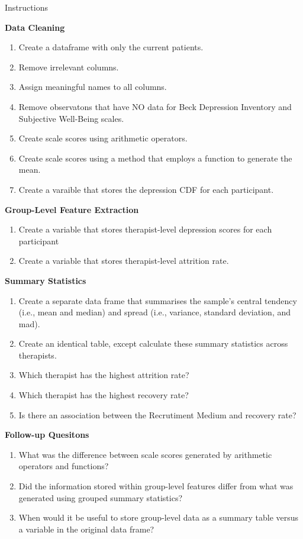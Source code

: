 \documentclass[]{book}
\theoremstyle{definition}
\theoremstyle{definition}
\theoremstyle{definition}
\theoremstyle{remark}
\begin{document}
Instructions

\textbf{Data Cleaning}

\begin{enumerate}
\def\labelenumi{\arabic{enumi}.}
\item
  Create a dataframe with only the current patients.
\item
  Remove irrelevant columns.
\item
  Assign meaningful names to all columns.
\item
  Remove observatons that have NO data for Beck Depression Inventory and Subjective Well-Being scales.
\item
  Create scale scores using arithmetic operators.
\item
  Create scale scores using a method that employs a function to generate the mean.
\item
  Create a varaible that stores the depression CDF for each participant.
\end{enumerate}

\textbf{Group-Level Feature Extraction}

\begin{enumerate}
\def\labelenumi{\arabic{enumi}.}
\item
  Create a variable that stores therapist-level depression scores for each participant
\item
  Create a variable that stores therapist-level attrition rate.
\end{enumerate}

\textbf{Summary Statistics}

\begin{enumerate}
\def\labelenumi{\arabic{enumi}.}
\item
  Create a separate data frame that summarises the sample's central tendency (i.e., mean and median) and spread (i.e., variance, standard deviation, and mad).
\item
  Create an identical table, except calculate these summary statistics across therapists.
\item
  Which therapist has the highest attrition rate?
\item
  Which therapist has the highest recovery rate?
\item
  Is there an association between the Recrutiment Medium and recovery rate?
\end{enumerate}

\textbf{Follow-up Quesitons}

\begin{enumerate}
\def\labelenumi{\arabic{enumi}.}
\item
  What was the difference between scale scores generated by arithmetic operators and functions?
\item
  Did the information stored within group-level features differ from what was generated using grouped summary statistics?
\item
  When would it be useful to store group-level data as a summary table versus a variable in the original data frame?
\end{enumerate}
\end{document}
